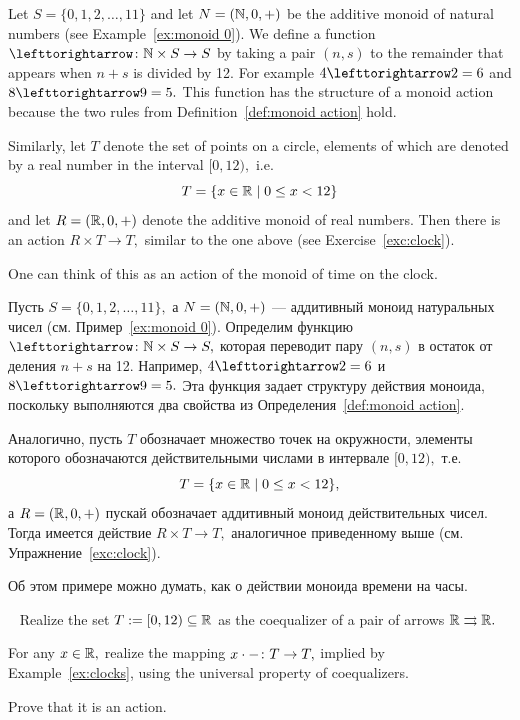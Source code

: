 \documentclass[../main/CT4S-EN-RU]{subfiles}
\begin{document}
\begin{exampleENG}\label{ex:clocks}
Let $S=\{0,1,2,\ldots,11\}$ and let $N=({\mathbb N},0,+)$ be the additive monoid of natural numbers (see Example~\ref{ex:monoid 0}).  We define a function $\acts\taking\NN\times S\to S$ by taking a pair $(n,s)$ to the remainder that appears when $n+s$ is divided by 12. For example $4\acts 2=6$ and $8\acts 9 = 5.$ This function has the structure of a monoid action because the two rules from Definition~\ref{def:monoid action} hold.

Similarly, let $T$ denote the set of points on a circle, elements of which are denoted by a real number in the interval $[0,12),$ i.e. $$T=\{x\in{\mathbb R}{\;|\;}0\leq x< 12\}$$ and let $R=({\mathbb R},0,+)$ denote the additive monoid of real numbers. Then there is an action $R\times T\to T,$ similar to the one above (see Exercise~\ref{exc:clock}).

One can think of this as an action of the monoid of time on the clock.
\end{exampleENG}

\begin{exampleRUS}\label{ex:clocks}
Пусть $S=\{0,1,2,\ldots,11\},$ а $N=({\mathbb N},0,+)$ — аддитивный моноид натуральных чисел (см. Пример~\ref{ex:monoid 0}). Определим функцию $\acts\taking\NN\times S\to S,$ которая переводит пару $(n,s)$ в остаток от деления $n+s$ на 12. Например, $4\acts 2=6$ и $8\acts 9 = 5.$ Эта функция задает структуру действия моноида, поскольку выполняются два свойства из Определения~\ref{def:monoid action}.

Аналогично, пусть $T$ обозначает множество точек на окружности, элементы которого обозначаются действительными числами в интервале $[0,12),$ т.е. $$T=\{x\in{\mathbb R}{\;|\;}0\leq x< 12\},$$ а $R=({\mathbb R},0,+)$ пускай обозначает аддитивный моноид действительных чисел. Тогда имеется действие $R\times T\to T,$ аналогичное приведенному выше (см. Упражнение~\ref{exc:clock}).

Об этом примере можно думать, как о действии моноида времени на часы.
\end{exampleRUS}

\begin{exerciseENG}\label{exc:clock}~
\sexc Realize the set $T:=[0,12)\subseteq{\mathbb R}$ as the coequalizer of a pair of arrows ${\mathbb R}\rightrightarrows{\mathbb R}.$
\item For any $x\in{\mathbb R},$ realize the mapping $x\cdot-\colon T\rightarrow T,$ implied by Example~\ref{ex:clocks}, using the universal property of coequalizers.
\item Prove that it is an action.
\endsexc
\end{exerciseENG}
\end{document}
